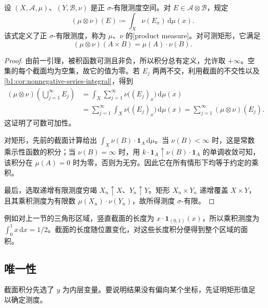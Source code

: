 \begin{theorem}\label{b1:thm:product-measure-construction}
设 \((X,\mathcal A,\mu)\)、\((Y,\mathcal B,\nu)\) 是正 \(\sigma\)-有限测度空间。对 \(E\in\mathcal A\otimes\mathcal B\)，规定
\[
(\mu\otimes\nu)(E)\coloneqq\int_X\nu(E_x)\,\mathrm d\mu(x).
\]
该式定义了正 \(\sigma\)-有限测度，称为 \(\mu\)、\(\nu\) 的[product measure]。对可测矩形，它满足
\[
(\mu\otimes\nu)(A\times B)=\mu(A)\cdot\nu(B).
\]
\end{theorem}
\begin{proof}
由前一引理，被积函数可测且非负，所以积分总有定义，允许取 \(+\infty\)。空集的每个截面均为空集，故它的值为零。若 \(E_j\) 两两不交，利用截面的不交性以及\cref{b1:cor:nonnegative-series-integral}，得到
\begin{align*}
(\mu\otimes\nu)\left(\bigcup_{j=1}^{\infty}E_j\right)
&=\int_X\sum_{j=1}^{\infty}\nu\bigl((E_j)_x\bigr)\,\mathrm d\mu(x)\\
&=\sum_{j=1}^{\infty}\int_X\nu\bigl((E_j)_x\bigr)\,\mathrm d\mu(x)
=\sum_{j=1}^{\infty}(\mu\otimes\nu)(E_j).
\end{align*}
这证明了可数可加性。

对矩形，先前的截面计算给出 \(\int_X\nu(B)\cdot\mathbf1_A\,\mathrm d\mu\)。当 \(\nu(B)<\infty\) 时，这是常数乘示性函数的积分；当 \(\nu(B)=\infty\) 时，用 \(k\cdot\mathbf1_A\uparrow\nu(B)\cdot\mathbf1_A\) 的单调收敛可知，该积分在 \(\mu(A)=0\) 时为零，否则为无穷。因此它在所有情形下均等于约定的乘积。

最后，选取递增有限测度穷竭 \(X_n\uparrow X\)、\(Y_n\uparrow Y\)。矩形 \(X_n\times Y_n\) 递增覆盖 \(X\times Y\)，且其乘积测度为有限数 \(\mu(X_n)\cdot\nu(Y_n)\)，故所得测度 \(\sigma\)-有限。
\end{proof}

例如对上一节的三角形区域，竖直截面的长度为 \(x\cdot\mathbf1_{(0,1)}(x)\)，所以乘积测度为 \(\int_0^1x\,\mathrm dx=1/2\)。截面的长度随位置变化，对这些长度积分便得到整个区域的面积。

\subsection{唯一性}
\label{b1:subsec:070203}

截面积分先选了 \(y\) 为内层变量。要说明结果没有偏向某个坐标，先证明矩形值足以确定测度。

